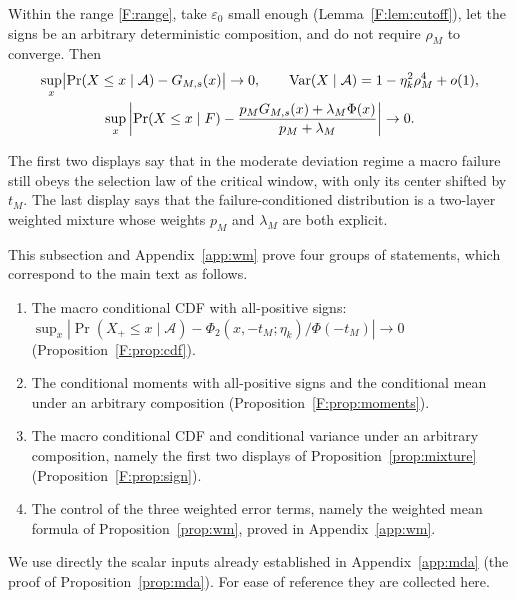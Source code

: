 \begin{proposition}\label{prop:mixture}
Within the range \eqref{F:range}, take $\varepsilon_0$ small enough (Lemma~\ref{F:lem:cutoff}),
let the signs be an arbitrary deterministic composition, and do not require $\rho_M$ to converge.
Then
\begin{gather*}
\sup_x\bigl|\Pr(X\le x\mid \mathcal A)-G_{M,s}(x)\bigr|\to0,\qquad
\operatorname{Var}(X\mid \mathcal A)=1-\eta_k^2\rho_M^4+o(1),\\
\sup_x\left|\Pr(X\le x\mid
F)-\frac{p_MG_{M,s}(x)+\lambda_M\Phi(x)}{p_M+\lambda_M}\right|\to0.
\end{gather*}
\end{proposition}
The first two displays say that in the moderate deviation regime a macro failure still obeys the
selection law of the critical window, with only its center shifted by $t_M$. The last display says
that the failure-conditioned distribution is a two-layer weighted mixture whose weights $p_M$ and
$\lambda_M$ are both explicit.

This subsection and Appendix~\ref{app:wm} prove four groups of statements, which correspond to
the main text as follows.
\begin{enumerate}[label=(\arabic*)]
\item The macro conditional CDF with all-positive signs:
$\sup_x|\Pr(X_+\le x\mid \mathcal A)-\Phi_2(x,-t_M;\eta_k)/\Phi(-t_M)|\to0$ (Proposition~\ref{F:prop:cdf}).
\item The conditional moments with all-positive signs and the conditional mean under an arbitrary
composition (Proposition~\ref{F:prop:moments}).
\item The macro conditional CDF and conditional variance under an arbitrary composition, namely
the first two displays of Proposition~\ref{prop:mixture} (Proposition~\ref{F:prop:sign}).
\item The control of the three weighted error terms, namely the weighted mean formula of
Proposition~\ref{prop:wm}, proved in Appendix~\ref{app:wm}.
\end{enumerate}

We use directly the scalar inputs already established in Appendix~\ref{app:mda} (the proof of
Proposition~\ref{prop:mda}). For ease of reference they are collected here.

